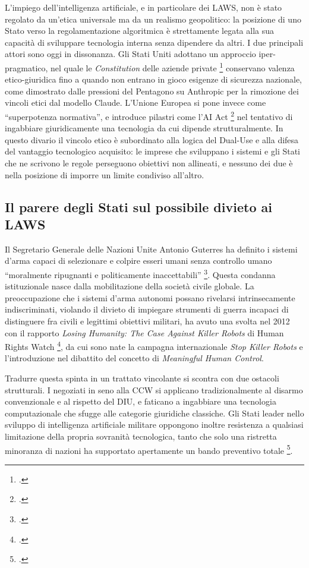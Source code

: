 \ifstampa\documentclass[a4paper,12pt,twoside,openright]{report}\else\documentclass[a4paper,12pt]{report}\fi
\newif\ifrevisione \revisionefalse
\DeclareRobustCommand{\rev}[1]{\ifrevisione{\color{blue!65!black}#1}\else#1\fi}
\begin{document}
L'impiego dell'intelligenza artificiale, e in particolare dei \rev{LAWS}, non è stato regolato da un'etica universale ma da un
realismo geopolitico: la posizione di uno Stato verso la regolamentazione
algoritmica è strettamente legata alla sua capacità di sviluppare tecnologia
interna senza dipendere da altri. I due principali attori sono oggi in
dissonanza. Gli Stati Uniti adottano un approccio iper-pragmatico, nel quale le
\textit{Constitution} delle aziende private \footcite{anthropic_constitution}
conservano valenza etico-giuridica fino a quando non entrano in gioco esigenze
di sicurezza nazionale, come dimostrato dalle pressioni del Pentagono su
Anthropic per la rimozione dei vincoli etici dal modello Claude. L'Unione
Europea si pone invece come ``superpotenza normativa'', e introduce pilastri
come l'AI Act \footcite{vogiatzoglou_2024_ai_act_exception} nel tentativo di ingabbiare giuridicamente
una tecnologia da cui dipende strutturalmente. In questo divario il vincolo etico è subordinato alla logica del Dual-Use e
alla difesa del vantaggio tecnologico acquisito: le imprese che sviluppano i
sistemi e gli Stati che ne scrivono le regole perseguono obiettivi non
allineati, e nessuno dei due è nella posizione di imporre un limite condiviso
all'altro.
 
\subsection{Il parere degli Stati sul possibile divieto ai LAWS}

Il Segretario Generale delle Nazioni Unite Antonio Guterres ha definito i
sistemi d'arma capaci di selezionare e colpire esseri umani senza controllo
umano ``moralmente ripugnanti e politicamente inaccettabili''
\footcite{un_2018_guterres_sgsm}. Questa condanna istituzionale nasce dalla
mobilitazione della società civile
globale. La preoccupazione che i sistemi d'arma autonomi possano rivelarsi
intrinsecamente indiscriminati, violando il divieto di impiegare strumenti di
guerra incapaci di distinguere fra civili e legittimi obiettivi militari, ha
avuto una svolta nel 2012 con il rapporto \textit{Losing Humanity: The Case
Against Killer Robots} di Human Rights Watch \footcite[p.~4]{wareham_2020}, da cui
sono nate la campagna internazionale \textit{Stop Killer Robots} e
l'introduzione nel dibattito del concetto di \textit{Meaningful Human Control}.
 
Tradurre questa spinta in un trattato vincolante si scontra con due ostacoli
strutturali. I negoziati in seno alla CCW si applicano tradizionalmente al
disarmo convenzionale e al rispetto del \rev{DIU},
e faticano a ingabbiare una tecnologia computazionale che sfugge alle categorie
giuridiche classiche. Gli Stati leader nello sviluppo di intelligenza
artificiale militare oppongono inoltre resistenza a qualsiasi limitazione della
propria sovranità tecnologica, tanto che solo una ristretta minoranza di nazioni
ha supportato apertamente un bando preventivo totale \footcite[p.~4]{wareham_2020}.
 
\end{document}
